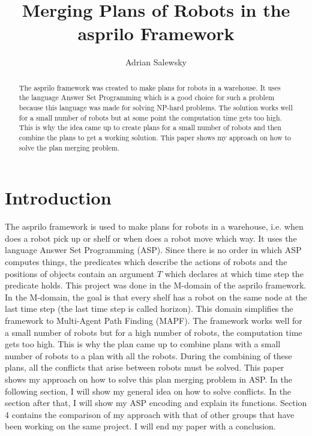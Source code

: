 \documentclass[runningheads]{llncs}
\begin{document}
\title{Merging Plans of Robots in the asprilo Framework}

\author{Adrian Salewsky}




\maketitle

\begin{abstract}
The asprilo framework was created to make plans for robots in a warehouse. It uses the language Answer Set Programming
which is a good choice for such a problem because this language was made for solving NP-hard problems. The solution works 
well for a small number of robots but at some point the computation time gets too high. This is why the idea came up to create plans
for a small number of robots and then combine the plans to get a working solution. This paper shows my approach on how to solve
the plan merging problem.
\end{abstract}


\section{Introduction}
The asprilo framework is used to make plans for robots in a warehouse, i.e. when does a robot pick up or shelf or when does a robot move which way. 
It uses the language Answer Set Programming (ASP). Since there is no order in which ASP computes things, the predicates which describe the actions of robots and
the positions of objects contain an argument $T$ which declares at which time step the predicate holds. This project was done in the M-domain of the asprilo framework.
In the M-domain, the goal is that every shelf has a robot on the same node at the last time step (the last time step is called horizon). This domain simplifies the framework 
to Multi-Agent Path Finding (MAPF). The framework works well for a small number of robots but for a high number of robots, the computation time gets too high. This is
why the plan came up to combine plans with a small number of robots to a plan with all the robots. During the combining of these plans, all the conflicts that arise between 
robots must be solved. This paper shows my approach on how to solve this plan merging problem in ASP. In the following section, I will show my general idea on how to solve 
conflicts. In the section after that, I will show my ASP encoding and explain its functions. Section 4 contains the comparison of my approach with that of other groups that have
been working on the same project. I will end my paper with a conclusion. 
\end{document}
